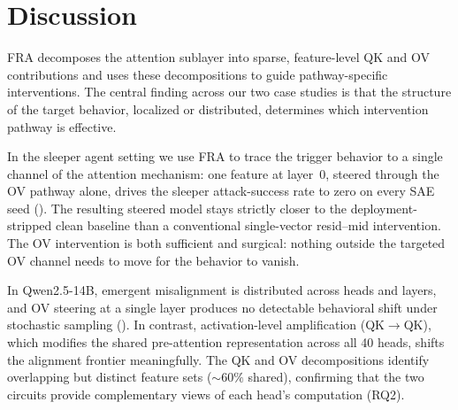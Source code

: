 \documentclass{article}
\theoremstyle{plain}
\theoremstyle{definition}
\theoremstyle{remark}
\begin{document}
\section{Discussion}
FRA decomposes the attention sublayer into sparse, feature-level QK and OV contributions and uses these decompositions to guide pathway-specific interventions. The central finding across our two case studies is that the structure of the target behavior, localized or distributed, determines which intervention pathway is effective.

In the sleeper agent setting we use FRA to trace the trigger behavior to a single channel of the attention mechanism: one feature at layer~0, steered through the OV pathway alone, drives the sleeper attack-success rate to zero on every SAE seed (). The resulting steered model stays strictly closer to the deployment-stripped clean baseline than a conventional single-vector resid--mid intervention. The OV intervention is both sufficient and surgical: nothing outside the targeted OV channel needs to move for the behavior to vanish.


In Qwen2.5-14B, emergent misalignment is distributed across heads and layers, and OV steering at a single layer produces no detectable behavioral shift under stochastic sampling (). In contrast, activation-level amplification (QK$\to$QK), which modifies the shared pre-attention representation across all 40 heads, shifts the alignment frontier meaningfully. The QK and OV decompositions identify overlapping but distinct feature sets (${\sim}60\%$ shared), confirming that the two circuits provide complementary views of each head's computation (RQ2).



\end{document}
